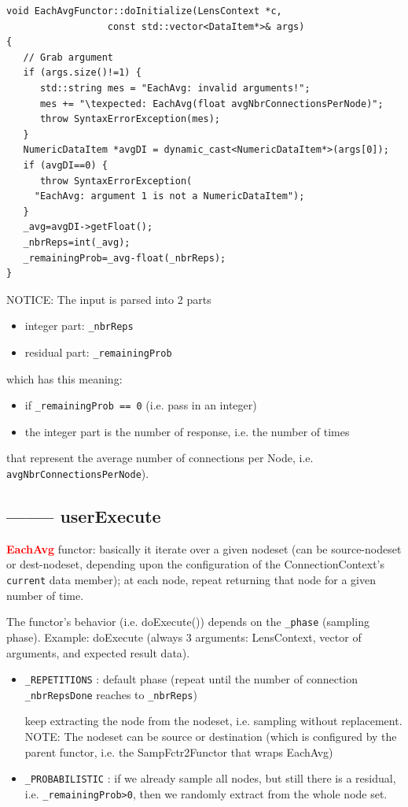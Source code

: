 {\tiny
\begin{lstlisting}
void EachAvgFunctor::doInitialize(LensContext *c, 
				  const std::vector<DataItem*>& args)
{
   // Grab argument 
   if (args.size()!=1) {
      std::string mes = "EachAvg: invalid arguments!";
      mes += "\texpected: EachAvg(float avgNbrConnectionsPerNode)";
      throw SyntaxErrorException(mes);
   }
   NumericDataItem *avgDI = dynamic_cast<NumericDataItem*>(args[0]);
   if (avgDI==0) {
      throw SyntaxErrorException(
	 "EachAvg: argument 1 is not a NumericDataItem");
   }
   _avg=avgDI->getFloat();
   _nbrReps=int(_avg);
   _remainingProb=_avg-float(_nbrReps);
}
\end{lstlisting}
}

NOTICE: The input is parsed into 2 parts
\begin{itemize}
  \item integer part: \verb!_nbrReps!
  \item residual part: \verb!_remainingProb!
\end{itemize}
which has this meaning:
\begin{itemize}
  \item if \verb!_remainingProb == 0!  (i.e. pass in an integer)
    
  \item the integer part is the number of response, i.e. the number of times 
\end{itemize}

that represent the average number of connections per Node, i.e.
\verb!avgNbrConnectionsPerNode!). 

\subsection{-------- userExecute}

\textcolor{red}{\bf EachAvg} functor: basically it iterate over a given nodeset
(can be source-nodeset or dest-nodeset, depending upon the configuration of the
ConnectionContext's \verb!current! data member); at each node, repeat returning
that node for a given number of time.

The functor's behavior (i.e. doExecute()) depends on the \verb!_phase! (sampling
phase). Example: doExecute (always 3 arguments: LensContext, vector of
arguments, and expected result data).
\begin{itemize}
  \item \verb!_REPETITIONS! : default phase (repeat until the number of
  connection \verb!_nbrRepsDone! reaches to \verb!_nbrReps!)
  
  keep extracting the node from the nodeset, i.e. sampling without replacement.
  NOTE: The nodeset can be source or destination (which is configured by the
  parent functor, i.e. the SampFctr2Functor that wraps EachAvg)
  
  \item \verb!_PROBABILISTIC! : if we already sample all nodes,
  but still there is a residual, i.e. \verb!_remainingProb>0!, then we randomly
  extract from the whole node set.
  
  
\end{itemize}

